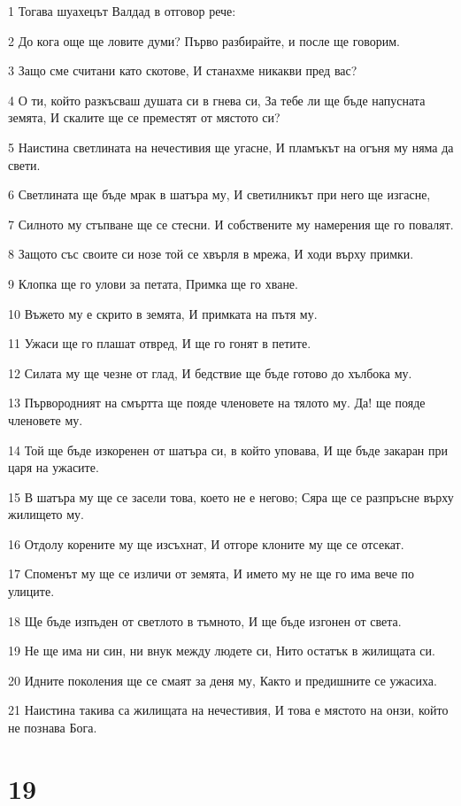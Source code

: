 \par 1 Тогава шуахецът Валдад в отговор рече:
\par 2 До кога още ще ловите думи? Първо разбирайте, и после ще говорим.
\par 3 Защо сме считани като скотове, И станахме никакви пред вас?
\par 4 О ти, който разкъсваш душата си в гнева си, За тебе ли ще бъде напусната земята, И скалите ще се преместят от мястото си?
\par 5 Наистина светлината на нечестивия ще угасне, И пламъкът на огъня му няма да свети.
\par 6 Светлината ще бъде мрак в шатъра му, И светилникът при него ще изгасне,
\par 7 Силното му стъпване ще се стесни. И собствените му намерения ще го повалят.
\par 8 Защото със своите си нозе той се хвърля в мрежа, И ходи върху примки.
\par 9 Клопка ще го улови за петата, Примка ще го хване.
\par 10 Въжето му е скрито в земята, И примката на пътя му.
\par 11 Ужаси ще го плашат отвред, И ще го гонят в петите.
\par 12 Силата му ще чезне от глад, И бедствие ще бъде готово до хълбока му.
\par 13 Първородният на смъртта ще пояде членовете на тялото му. Да! ще пояде членовете му.
\par 14 Той ще бъде изкоренен от шатъра си, в който уповава, И ще бъде закаран при царя на ужасите.
\par 15 В шатъра му ще се засели това, което не е негово; Сяра ще се разпръсне върху жилището му.
\par 16 Отдолу корените му ще изсъхнат, И отгоре клоните му ще се отсекат.
\par 17 Споменът му ще се изличи от земята, И името му не ще го има вече по улиците.
\par 18 Ще бъде изпъден от светлото в тъмното, И ще бъде изгонен от света.
\par 19 Не ще има ни син, ни внук между людете си, Нито остатък в жилищата си.
\par 20 Идните поколения ще се смаят за деня му, Както и предишните се ужасиха.
\par 21 Наистина такива са жилищата на нечестивия, И това е мястото на онзи, който не познава Бога.

\chapter{19}

